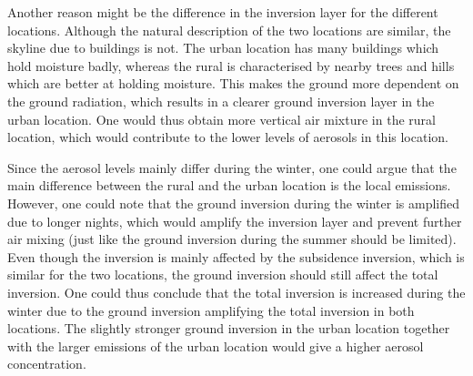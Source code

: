 Another reason might be the difference in the inversion layer for the different locations. Although the natural description of the two locations are similar, the skyline due to buildings is not. The urban location has many buildings which hold moisture badly, whereas the rural is characterised by nearby trees and hills which are better at holding moisture. This makes the ground more dependent on the ground radiation, which results in a clearer ground inversion layer in the urban location. One would thus obtain more vertical air mixture in the rural location, which would contribute to the lower levels of aerosols in this location. 

Since the aerosol levels mainly differ during the winter, one could argue that the main difference between the rural and the urban location is the local emissions. However, one could note that the ground inversion during the winter is amplified due to longer nights, which would amplify the inversion layer and prevent further air mixing (just like the ground inversion during the summer should be limited). Even though the inversion is mainly affected by the subsidence inversion, which is similar for the two locations, the ground inversion should still affect the total inversion. One could thus conclude that the total inversion is increased during the winter due to the ground inversion amplifying the total inversion in both locations. The slightly stronger ground inversion in the urban location together with the larger emissions of the urban location would give a higher aerosol concentration.
